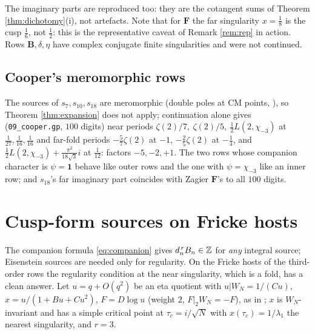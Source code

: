 \documentclass[11pt]{amsart}
\theoremstyle{definition}
\theoremstyle{remark}
\begin{document}
The imaginary parts are reproduced too: they are the cotangent sums of Theorem \ref{thm:dichotomy}(i), not artefacts. Note that for $\mathbf F$ the far singularity $x=\tfrac18$ is the cusp $\tfrac16$, not $\tfrac12$: this is the representative caveat of Remark \ref{rem:rep} in action. Rows $\mathbf B,\delta,\eta$ have complex conjugate finite singularities and were not continued.

\subsection{Cooper's meromorphic rows}
The sources of $s_7,s_{10},s_{18}$ are meromorphic (double poles at CM points, \cite[\S3.5]{Companions}), so Theorem \ref{thm:expansion} does not apply; continuation alone gives (\texttt{09\_cooper.gp}, $100$ digits) near periods $\zeta(2)/7,\ \zeta(2)/5,\ \tfrac12L(2,\chi_{-3})$ at $\tfrac1{27},\tfrac1{16},\tfrac1{16}$ and far-fold periods $-\tfrac57\zeta(2)$ at $-1$, $-\tfrac25\zeta(2)$ at $-\tfrac14$, and $\tfrac12L(2,\chi_{-3})+\tfrac{\pi^2}{18\sqrt3}i$ at $\tfrac1{12}$: factors $-5,-2,+1$. The two rows whose companion character is $\psi=\mathbf 1$ \cite[Thm.~3.3]{Companions} behave like outer rows and the one with $\psi=\chi_{-3}$ like an inner row; and $s_{18}$'s far imaginary part coincides with Zagier $\mathbf F$'s to all $100$ digits.

\section{Cusp-form sources on Fricke hosts}\label{sec:fricke}

The companion formula \eqref{eq:companion} gives $d_n^{\,r}B_n\in\mathbb Z$ for \emph{any} integral source; Eisenstein sources are needed only for regularity. On the Fricke hosts of the third-order rows the regularity condition at the near singularity, which is a fold, has a clean answer. Let $u=q+O(q^2)$ be an eta quotient with $u|W_N=1/(Cu)$, $x=u/(1+Bu+Cu^2)$, $F=D\log u$ (weight $2$, $F|_2W_N=-F$), as in \cite[(2.5)]{Companions}; $x$ is $W_N$-invariant and has a simple critical point at $\tau_c=i/\sqrt N$ with $x(\tau_c)=1/\lambda_1$ the nearest singularity, and $r=3$.
\end{document}
